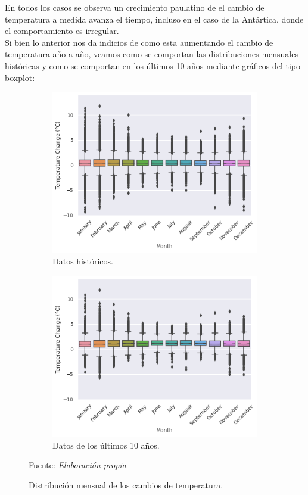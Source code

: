 \documentclass[12pt]{article}
\newcommand{\source}[1]{\caption*{Fuente: {\textit{#1}}} }
\begin{document}
En todos los casos se observa un crecimiento paulatino de el cambio de temperatura a medida avanza el tiempo, incluso en el caso de la Antártica, donde el comportamiento es irregular.\\
Si bien lo anterior nos da indicios de como esta aumentando el cambio de temperatura año a año, veamos como se comportan las distribuciones mensuales históricas y como se comportan en los últimos 10 años mediante gráficos del tipo boxplot:
\begin{figure}[H]
     \centering
     \begin{subfigure}[b]{0.45\textwidth}
         \centering
         \includegraphics[width=\textwidth]{fig/fig_5.png}
         \caption{Datos históricos.}
    \label{fig:fig_1}
     \end{subfigure}
     \hfill
     \begin{subfigure}[b]{0.45\textwidth}
         \centering
         \includegraphics[width=\textwidth]{fig/fig_6.png}
         \caption{Datos de los últimos 10 años.}
    \label{fig:fig_1}
     \end{subfigure}
        \caption{Distribución mensual de los cambios de temperatura.}
        \vspace{-0.3cm}
        \source{Elaboración propia}
    \label{fig:fig_1}
\end{figure}\\
\end{document}
